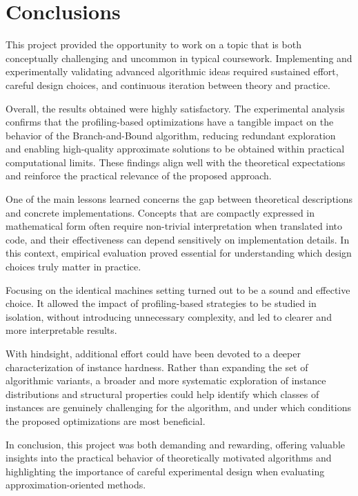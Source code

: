 \chapter{Conclusions}
\label{ch:conclusions}

This project provided the opportunity to work on a topic that is both conceptually challenging and uncommon in typical coursework. Implementing and experimentally validating advanced algorithmic ideas required sustained effort, careful design choices, and continuous iteration between theory and practice.

Overall, the results obtained were highly satisfactory. The experimental analysis confirms that the profiling-based optimizations have a tangible impact on the behavior of the Branch-and-Bound algorithm, reducing redundant exploration and enabling high-quality approximate solutions to be obtained within practical computational limits. These findings align well with the theoretical expectations and reinforce the practical relevance of the proposed approach.

One of the main lessons learned concerns the gap between theoretical descriptions and concrete implementations. Concepts that are compactly expressed in mathematical form often require non-trivial interpretation when translated into code, and their effectiveness can depend sensitively on implementation details. In this context, empirical evaluation proved essential for understanding which design choices truly matter in practice.

Focusing on the identical machines setting turned out to be a sound and effective choice. It allowed the impact of profiling-based strategies to be studied in isolation, without introducing unnecessary complexity, and led to clearer and more interpretable results.

With hindsight, additional effort could have been devoted to a deeper characterization of instance hardness. Rather than expanding the set of algorithmic variants, a broader and more systematic exploration of instance distributions and structural properties could help identify which classes of instances are genuinely challenging for the algorithm, and under which conditions the proposed optimizations are most beneficial.

In conclusion, this project was both demanding and rewarding, offering valuable insights into the practical behavior of theoretically motivated algorithms and highlighting the importance of careful experimental design when evaluating approximation-oriented methods.
